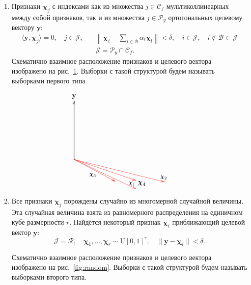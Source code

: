 \documentclass[a4paper,12pt]{article}
\newcommand{\by}{\mathbf{y}}
\newcommand{\bchi}{\boldsymbol{\chi}}
\newcommand{\calC}{\mathcal{C}}
\newcommand{\calP}{\mathcal{P}}
\newcommand{\calR}{\mathcal{R}}
\newcommand{\calJ}{\mathcal{J}}
\theoremstyle{plain}
\begin{document}
\begin{enumerate}
\item Признаки $\bchi_j$ с индексами как из множества $ j \in \calC_f$ мультиколлинеарных между собой признаков, так и из множества $ j \in \calP_y$ ортогональных целевому вектору $\by$:
\begin{equation}
\begin{split}
\langle \by, \bchi_j \rangle = 0, \quad j \in \calJ, \quad & 
\left \| \bchi_i - \sum\limits_{l \in \mathcal{B}} \alpha_l\bchi_l \right \| < \delta, \quad i \in \calJ, \quad i \not\in \mathcal{B} \subset \calJ \\
& \calJ = \calP_y \cap \calC_f.
\end{split}
\label{eq:ortcol}
\end{equation}
Схематично взаимное расположение признаков и целевого вектора изображено на рис.~\ref{fig:ortcol}. Выборки с такой структурой будем называть выборками первого типа.  
\begin{figure}[!h]
\begin{equation*}
\xymatrix{
\by & \\
& \\
& \\
*=0{.}\ar@[red][rrrd]_>>{{\large \bchi_1}}+/0 5pt/ %
\ar[uuu] %
\ar@[red][rrrrd]^>>{{\large \bchi}_2}+/va(-90) 10pt/ %
\ar@[red][rrrd]+/va(-135) 13pt/ %
\ar@[red][rrd]_{\large{\bchi}_3}!/va(-90) 15pt/ & & & & & \\
& & & \bchi_4 & &
}
\end{equation*}
\caption{}
\label{fig:ortcol}
\end{figure}

%

\item Все признаки $\bchi_j$ порождены случайно из многомерной случайной величины. Эта случайная величина взята из равномерного распределения на единичном кубе размерности $r$. Найдётся некоторый признак $\bchi_i$ приближающий целевой вектор $\by$:
\begin{equation}
\calJ = \calR, \quad \bchi_1,\ldots,\bchi_r \sim \mathcal{\mathrm{U}}[0, 1]^r, \quad \|\by - \bchi_i\| < \delta.
\label{eq:random}
\end{equation}

Схематично взаимное расположение признаков и целевого вектора изображено на рис.~\ref{fig:random}. Выборки с такой структурой будем называть выборками второго типа.  


\end{enumerate}
\end{document}

